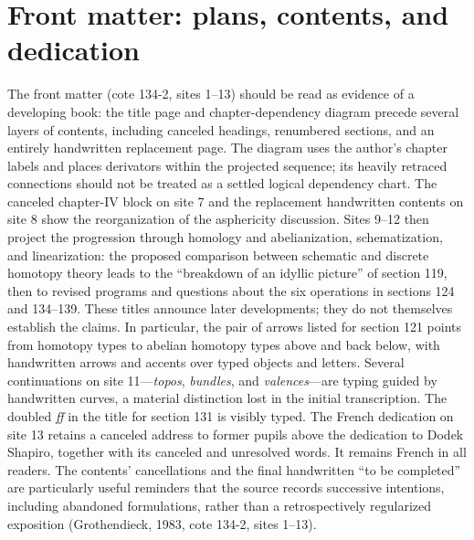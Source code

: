 \section*{Front matter: plans, contents, and dedication}
The front matter (cote 134-2, sites 1--13) should be read as evidence of a developing book: the title page and chapter-dependency diagram precede several layers of contents, including canceled headings, renumbered sections, and an entirely handwritten replacement page. The diagram uses the author's chapter labels and places derivators within the projected sequence; its heavily retraced connections should not be treated as a settled logical dependency chart. The canceled chapter-IV block on site 7 and the replacement handwritten contents on site 8 show the reorganization of the asphericity discussion. Sites 9--12 then project the progression through homology and abelianization, schematization, and linearization: the proposed comparison between schematic and discrete homotopy theory leads to the ``breakdown of an idyllic picture'' of section 119, then to revised programs and questions about the six operations in sections 124 and 134--139. These titles announce later developments; they do not themselves establish the claims. In particular, the pair of arrows listed for section 121 points from homotopy types to abelian homotopy types above and back below, with handwritten arrows and accents over typed objects and letters. Several continuations on site 11---\emph{topos}, \emph{bundles}, and \emph{valences}---are typing guided by handwritten curves, a material distinction lost in the initial transcription. The doubled \emph{ff} in the title for section 131 is visibly typed. The French dedication on site 13 retains a canceled address to former pupils above the dedication to Dodek Shapiro, together with its canceled and unresolved words. It remains French in all readers. The contents' cancellations and the final handwritten ``to be completed'' are particularly useful reminders that the source records successive intentions, including abandoned formulations, rather than a retrospectively regularized exposition (Grothendieck, 1983, cote 134-2, sites 1--13).
